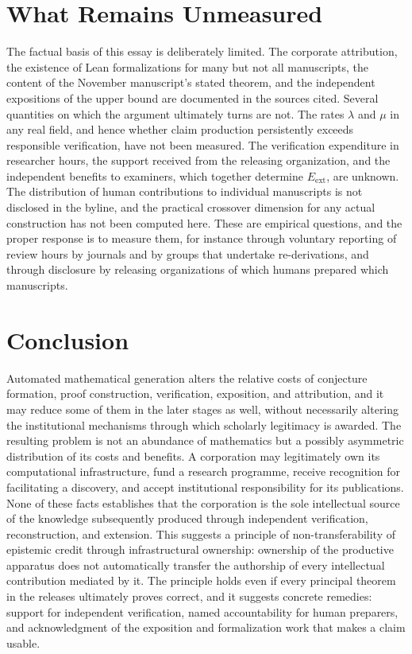 \documentclass[12pt]{article}
\begin{document}
\section{What Remains Unmeasured}

The factual basis of this essay is deliberately limited. The corporate attribution, the existence of Lean formalizations for many but not all manuscripts, the content of the November manuscript's stated theorem, and the independent expositions of the upper bound are documented in the sources cited. Several quantities on which the argument ultimately turns are not. The rates $\lambda$ and $\mu$ in any real field, and hence whether claim production persistently exceeds responsible verification, have not been measured. The verification expenditure in researcher hours, the support received from the releasing organization, and the independent benefits to examiners, which together determine $E_{\mathrm{ext}}$, are unknown. The distribution of human contributions to individual manuscripts is not disclosed in the byline, and the practical crossover dimension for any actual construction has not been computed here. These are empirical questions, and the proper response is to measure them, for instance through voluntary reporting of review hours by journals and by groups that undertake re-derivations, and through disclosure by releasing organizations of which humans prepared which manuscripts.

\section{Conclusion}

Automated mathematical generation alters the relative costs of conjecture formation, proof construction, verification, exposition, and attribution, and it may reduce some of them in the later stages as well, without necessarily altering the institutional mechanisms through which scholarly legitimacy is awarded. The resulting problem is not an abundance of mathematics but a possibly asymmetric distribution of its costs and benefits. A corporation may legitimately own its computational infrastructure, fund a research programme, receive recognition for facilitating a discovery, and accept institutional responsibility for its publications. None of these facts establishes that the corporation is the sole intellectual source of the knowledge subsequently produced through independent verification, reconstruction, and extension. This suggests a principle of non-transferability of epistemic credit through infrastructural ownership: ownership of the productive apparatus does not automatically transfer the authorship of every intellectual contribution mediated by it. The principle holds even if every principal theorem in the releases ultimately proves correct, and it suggests concrete remedies: support for independent verification, named accountability for human preparers, and acknowledgment of the exposition and formalization work that makes a claim usable.
\end{document}
